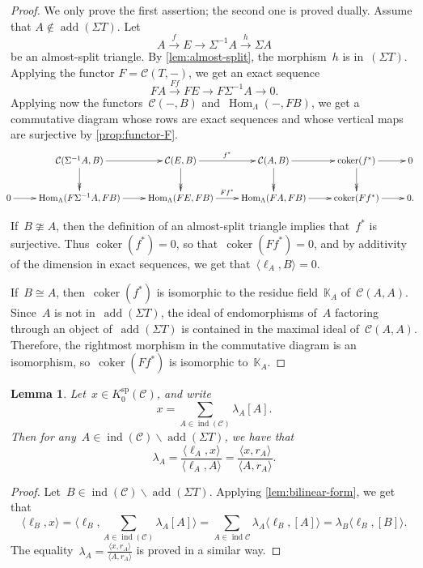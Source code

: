 \documentclass{amsart}
\newtheorem{lemma}[theorem]{Lemma}
\theoremstyle{definition}
\newcommand{\ssm}{\smallsetminus} %
\newcommand{\field}{\mathbb{K}}
\newcommand{\cat}{\mathcal{C}}
\newcommand{\Hom}[1]{\operatorname{Hom}_{#1}}
\newcommand{\susp}{\Sigma}
\newcommand{\add}{\operatorname{add}}
\newcommand{\spl}{\operatorname{sp}}
\newcommand{\Ksp}{K_0^{\spl}}
\newcommand{\ind}{\operatorname{ind}}
\newcommand{\coker}{\operatorname{coker}}
\begin{document}
\begin{proof}
We only prove the first assertion; the second one is proved dually. Assume that ${A\notin\add(\susp T)}$. Let
\[
A \xrightarrow{f} E \xrightarrow{} \susp^{-1} A \xrightarrow{h} \susp A
\]
be an almost-split triangle. By \cref{lem:almost-split}, the morphism~$h$ is in~$(\susp T)$. Applying the functor ${F=\cat(T,-)}$, we get an exact sequence
\[
FA\xrightarrow{Ff} FE \xrightarrow{} F\susp^{-1} A \xrightarrow{} 0.
\]
Applying now the functors~$\cat(-, B)$ and~$\Hom{\Lambda}(-, FB)$, we get a commutative diagram whose rows are exact sequences and whose vertical maps are surjective by \cref{prop:functor-F}.
\[
\hspace{-.3cm}
\xymatrix{ & \cat(\susp^{-1} A, B)\ar[r]\ar@{->>}[d] & \cat(E, B)\ar[r]^{f^*}\ar@{->>}[d] & \cat(A,B)\ar[r]\ar@{->>}[d] & \coker(f^*)\ar[r]\ar@{->>}[d] & 0 \\
0 \ar[r] & \Hom{\Lambda}(F\susp^{-1} A, FB)\ar[r] & \Hom{\Lambda}(FE, FB)\ar[r]^{Ff^*} & \Hom{\Lambda}(FA, FB)\ar[r] & \coker(Ff^*)\ar[r] & 0.
}
\]

If~$B\ncong A$, then the definition of an almost-split triangle implies that~$f^*$ is surjective. Thus $\coker(f^*)=0$, so that~$\coker(Ff^*) = 0$, and by additivity of the dimension in exact sequences, we get that~$\langle \ell_A, B \rangle =0$.
 
If~$B\cong A$, then~$\coker(f^*)$ is isomorphic to the residue field~$\field_A$ of~$\cat(A,A)$. Since~$A$ is not in~$\add(\susp T)$, the ideal of endomorphisms of~$A$ factoring through an object of~$\add(\susp T)$ is contained in the maximal ideal of~$\cat(A,A)$. Therefore, the rightmost morphism in the commutative diagram is an isomorphism, so~$\coker(Ff^*)$ is isomorphic to~$\field_A$.
\end{proof}

\begin{lemma}
\label{lem:coefficients}
Let~$x \in \Ksp(\cat)$, and write~\[x=\sum_{A \in \ind(\cat)} \lambda_A [A].\]  Then for any~$A\in\ind(\cat) \ssm \add(\susp T)$, we have that
\[
\lambda_A = \frac{\langle \ell_A, x \rangle}{\langle \ell_A, A \rangle} = \frac{\langle x, r_A \rangle}{\langle A, r_A \rangle}.
\]
\end{lemma}

\begin{proof}
Let~$B \in \ind(\cat) \ssm \add(\susp T)$. Applying \cref{lem:bilinear-form}, we get that
\[
\langle \ell_B, x \rangle = \Big\langle \ell_B, \sum_{A \in \ind(\cat)} \lambda_A [A] \Big\rangle = \sum_{A \in \ind{\cat}} \lambda_A \langle \ell_B, [A] \rangle = \lambda_B \langle \ell_B, [B] \rangle.
\]
The equality~$\lambda_A = \frac{\langle x, r_A \rangle}{\langle A, r_A \rangle}$ is proved in a similar way.
\end{proof}
\end{document}
